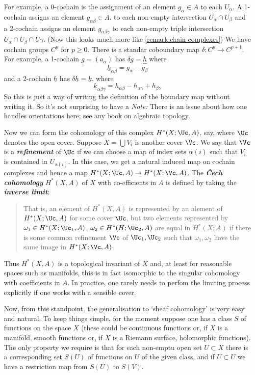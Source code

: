 For example, a 0-cochain is the assignment of an element $g_\alpha\in A$ to each $U_\alpha$. A 1-cochain assigns an element $g_{\alpha\beta}\in A$. to each non-empty intersection $U_\alpha\cap U_\beta$ and a 2-cochain assigns an element $g_{\alpha\beta\gamma}$ to each non-empty triple intersection $U_\alpha\cap U_\beta\cap U\gamma$. {\color{cyan}(Now this looks much more like \cref{remark:chain-complexes})} We have cochain groups $C^p$ for $p\geq 0$. There is a standar coboundary map $\delta:C^p\to C^{p+1}$. For example, a 1-cochain $\underline{g}=(a_\alpha)$ has $\delta\underline{g}=\underbrace{h}$ where
\[\underline{h}_{\alpha\beta}=g_\alpha-g_\beta\]
and a 2-cochain $\underline{h}$ has $\delta\underline{h}=\underline{k}$, where
\[\underline{k}_{\alpha\beta\gamma}=h_{\alpha\beta}-h_{\alpha\gamma}+h_{\beta\gamma}\]
{\color{cyan}So this is just a way of writing the definition of the boundary map without writing it. So it's not surprising to have a} \textit{Note:} There is an issue about how one handles orientations here; see any book on algebraic topology.

Now we can form the cohomology of this complex $H^*(X;\Uc,A)$, say, where $\Uc$ denotes the open cover. Suppose $X=\bigcup V_i$ is another cover $\Vc$. We say that $\Vc$ is a \textbf{\textit{refinement}} of $\Uc$ if we can choose a map of index sets $\alpha(i)$ such that $V_i$ is contained in $U_{\alpha(i)}$. In this case, we get a natural induced map on cochain complexes and hence a map $H^*(X;\Uc,A)\to H^*(X;\Vc,A)$. The \textbf{\textit{\v Cech cohomology}} $H^*(X,A)$ of $X$ with co-efficients in $A$ is defined by taking the \textbf{\textit{inverse limit}}:

\begin{quote}
	That is, an element of $H^*(X,A)$ is represented by an alement of $H^*(X;\Uc,A)$ for some cover $\Uc$, but two elements represented by $\omega_1\in H^*(X;\Uc_1,A)$, $\omega_2\in H^*(H;\Uc_2,A)$ are equal in $H^*(X;A)$ if there is some common refinement $\Vc$ of $\Uc_1,\Uc_2$ such that $\omega_1,\omega_2$ have the same image in $H^*(X;\Vc,A)$.
\end{quote}
Thus $H^*(X,A)$ is a topological invariant of $X$ and, at least for reasonable spaces such as manifolds, this is in fact isomorphic to the singular cohomology with coefficients in $A$. In practice, one rarely needs to perfom the limiting process explicitly if one works with a sensible cover.

Now, from this standpoint, the generalisation to ‘sheaf cohomology’ is very easy and natural. To keep things simple, for the moment suppose one has a class $S$ of functions on the space $X$ (these could be continuous functions or, if $X$ is a manifold, smooth functions or, if $X$ is a Riemann surface, holomorphic functions). The only property we require is that for each non-emptu open set $U\subset X$ there is a corresponding set $S(U)$ of functions on $U$ of the given class, and if $U\subset U$ we have a restriction map from $S(U)$ to $S(V)$.

